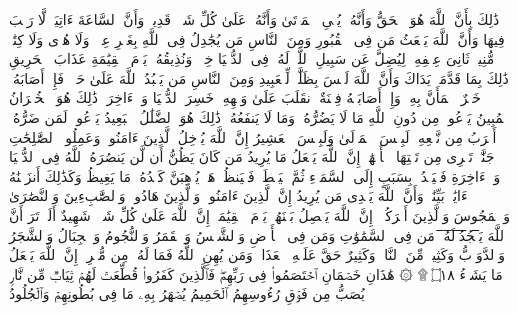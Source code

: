 \startbuffer[\q:22:6]
ذَٰلِكَ بِأَنَّ ٱللَّهَ هُوَ ٱلۡحَقُّ وَأَنَّهُۥ یُحۡیِ ٱلۡمَوۡتَىٰ وَأَنَّهُۥ عَلَىٰ كُلِّ شَیۡءࣲ قَدِیرࣱ%
\stopbuffer
\startbuffer[\q:22:7]
وَأَنَّ ٱلسَّاعَةَ ءَاتِیَةࣱ لَّا رَیۡبَ فِیهَا وَأَنَّ ٱللَّهَ یَبۡعَثُ مَن فِی ٱلۡقُبُورِ%
\stopbuffer
\startbuffer[\q:22:8]
وَمِنَ ٱلنَّاسِ مَن یُجَٰدِلُ فِی ٱللَّهِ بِغَیۡرِ عِلۡمࣲ وَلَا هُدࣰى وَلَا كِتَٰبࣲ مُّنِیرࣲ%
\stopbuffer
\startbuffer[\q:22:9]
ثَانِیَ عِطۡفِهِۦ لِیُضِلَّ عَن سَبِیلِ ٱللَّهِۖ لَهُۥ فِی ٱلدُّنۡیَا خِزۡیࣱۖ وَنُذِیقُهُۥ یَوۡمَ ٱلۡقِیَٰمَةِ عَذَابَ ٱلۡحَرِیقِ%
\stopbuffer
\startbuffer[\q:22:10]
ذَٰلِكَ بِمَا قَدَّمَتۡ یَدَاكَ وَأَنَّ ٱللَّهَ لَیۡسَ بِظَلَّٰمࣲ لِّلۡعَبِیدِ%
\stopbuffer
\startbuffer[\q:22:11]
وَمِنَ ٱلنَّاسِ مَن یَعۡبُدُ ٱللَّهَ عَلَىٰ حَرۡفࣲۖ فَإِنۡ أَصَابَهُۥ خَیۡرٌ ٱطۡمَأَنَّ بِهِۦۖ وَإِنۡ أَصَابَتۡهُ فِتۡنَةٌ ٱنقَلَبَ عَلَىٰ وَجۡهِهِۦ خَسِرَ ٱلدُّنۡیَا وَٱلۡءَاخِرَةَۚ ذَٰلِكَ هُوَ ٱلۡخُسۡرَانُ ٱلۡمُبِینُ%
\stopbuffer
\startbuffer[\q:22:12]
یَدۡعُوا۟ مِن دُونِ ٱللَّهِ مَا لَا یَضُرُّهُۥ وَمَا لَا یَنفَعُهُۥۚ ذَٰلِكَ هُوَ ٱلضَّلَٰلُ ٱلۡبَعِیدُ%
\stopbuffer
\startbuffer[\q:22:13]
یَدۡعُوا۟ لَمَن ضَرُّهُۥۤ أَقۡرَبُ مِن نَّفۡعِهِۦۚ لَبِئۡسَ ٱلۡمَوۡلَىٰ وَلَبِئۡسَ ٱلۡعَشِیرُ%
\stopbuffer
\startbuffer[\q:22:14]
إِنَّ ٱللَّهَ یُدۡخِلُ ٱلَّذِینَ ءَامَنُوا۟ وَعَمِلُوا۟ ٱلصَّٰلِحَٰتِ جَنَّٰتࣲ تَجۡرِی مِن تَحۡتِهَا ٱلۡأَنۡهَٰرُۚ إِنَّ ٱللَّهَ یَفۡعَلُ مَا یُرِیدُ%
\stopbuffer
\startbuffer[\q:22:15]
مَن كَانَ یَظُنُّ أَن لَّن یَنصُرَهُ ٱللَّهُ فِی ٱلدُّنۡیَا وَٱلۡءَاخِرَةِ فَلۡیَمۡدُدۡ بِسَبَبٍ إِلَى ٱلسَّمَاۤءِ ثُمَّ لۡیَقۡطَعۡ فَلۡیَنظُرۡ هَلۡ یُذۡهِبَنَّ كَیۡدُهُۥ مَا یَغِیظُ%
\stopbuffer
\startbuffer[\q:22:16]
وَكَذَٰلِكَ أَنزَلۡنَٰهُ ءَایَٰتِۭ بَیِّنَٰتࣲ وَأَنَّ ٱللَّهَ یَهۡدِی مَن یُرِیدُ%
\stopbuffer
\startbuffer[\q:22:17]
إِنَّ ٱلَّذِینَ ءَامَنُوا۟ وَٱلَّذِینَ هَادُوا۟ وَٱلصَّٰبِءِینَ وَٱلنَّصَٰرَىٰ وَٱلۡمَجُوسَ وَٱلَّذِینَ أَشۡرَكُوۤا۟ إِنَّ ٱللَّهَ یَفۡصِلُ بَیۡنَهُمۡ یَوۡمَ ٱلۡقِیَٰمَةِۚ إِنَّ ٱللَّهَ عَلَىٰ كُلِّ شَیۡءࣲ شَهِیدٌ%
\stopbuffer
\startbuffer[\q:22:18]
أَلَمۡ تَرَ أَنَّ ٱللَّهَ یَ̅سۡ̅جُ̅دُ̅ ̅لَ̅هُ̅ۥ̅ مَن فِی ٱلسَّمَٰوَٰتِ وَمَن فِی ٱلۡأَرۡضِ وَٱلشَّمۡسُ وَٱلۡقَمَرُ وَٱلنُّجُومُ وَٱلۡجِبَالُ وَٱلشَّجَرُ وَٱلدَّوَاۤبُّ وَكَثِیرࣱ مِّنَ ٱلنَّاسِۖ وَكَثِیرٌ حَقَّ عَلَیۡهِ ٱلۡعَذَابُۗ وَمَن یُهِنِ ٱللَّهُ فَمَا لَهُۥ مِن مُّكۡرِمٍۚ إِنَّ ٱللَّهَ یَفۡعَلُ مَا یَشَاۤءُ ۝١٨ ۩%
\stopbuffer
\startbuffer[\q:22:19]
۞ هَٰذَانِ خَصۡمَانِ ٱخۡتَصَمُوا۟ فِی رَبِّهِمۡۖ فَٱلَّذِینَ كَفَرُوا۟ قُطِّعَتۡ لَهُمۡ ثِیَابࣱ مِّن نَّارࣲ یُصَبُّ مِن فَوۡقِ رُءُوسِهِمُ ٱلۡحَمِیمُ%
\stopbuffer
\startbuffer[\q:22:20]
یُصۡهَرُ بِهِۦ مَا فِی بُطُونِهِمۡ وَٱلۡجُلُودُ%
\stopbuffer
